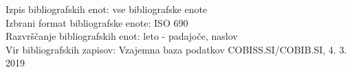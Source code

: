 \documentclass[10pt,a4paper]{book}
\begin{document}
\vspace{1ex}
Izpis bibliografskih enot: vse bibliografske enote \\
Izbrani format bibliografske enote: ISO 690 \\
Razvr\v{s}\v{c}anje bibliografskih enot: leto - padajo\v{c}e, naslov \\
\vspace{1ex}
Vir bibliografskih zapisov: Vzajemna baza podatkov COBISS.SI/COBIB.SI, 4.
3. 2019\\
\vspace{1em}
 
\end{document}

